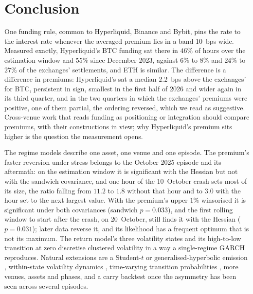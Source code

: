 \documentclass[10pt,a4paper]{article}
\begin{document}
\section{Conclusion}\label{sec:conclusion}

One funding rule, common to Hyperliquid, Binance and Bybit, pins the rate to the interest rate whenever the averaged premium lies in a band 10~bps wide. Measured exactly, Hyperliquid's BTC funding sat there in $46\%$ of hours over the estimation window and $55\%$ since December 2023, against $6\%$ to $8\%$ and $24\%$ to $27\%$ of the exchanges' settlements, and ETH is similar. The difference is a difference in premiums: Hyperliquid's sat a median $2.2$~bps above the exchanges' for BTC, persistent in sign, smallest in the first half of 2026 and wider again in its third quarter, and in the two quarters in which the exchanges' premiums were positive, one of them partial, the ordering reversed, which we read as suggestive. Cross-venue work that reads funding as positioning or integration should compare premiums, with their constructions in view; why Hyperliquid's premium sits higher is the question the measurement opens.

The regime models describe one asset, one venue and one episode. The premium's faster reversion under stress belongs to the October 2025 episode and its aftermath: on the estimation window it is significant with the Hessian but not with the sandwich covariance, and one hour of the 10~October crash sets most of its size, the ratio falling from $11.2$ to $1.8$ without that hour and to $3.0$ with the hour set to the next largest value. With the premium's upper $1\%$ winsorised it is significant under both covariances (sandwich $p = 0.033$), and the first rolling window to start after the crash, on 20~October, still finds it with the Hessian ($p = 0.031$); later data reverse it, and its likelihood has a frequent optimum that is not its maximum. The return model's three volatility states and its high-to-low transition at zero discretise clustered volatility in a way a single-regime GARCH reproduces. Natural extensions are a Student-$t$ or generalised-hyperbolic emission \citep{foroni2024hidden}, within-state volatility dynamics \citep{haas2004new}, time-varying transition probabilities \citep{filardo1994business}, more venues, assets and phases, and a carry backtest once the asymmetry has been seen across several episodes.

\end{document}

